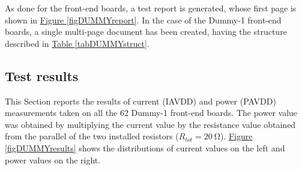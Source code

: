 \par
As done for the front-end boards, a test report is generated, whose first page is shown in \hyperref[figDUMMYreport]{Figure \ref{figDUMMYreport}}. In the case of the Dummy-1 front-end boards, a single multi-page document has been created, having the structure described in \hyperref[tabDUMMYstruct]{Table \ref{tabDUMMYstruct}}.

\begin{table}[h!]
    \centering
    \def\arraystretch{1.3}
    \caption{Structure of the entry for the Dummy-1 front-end boards test report.}
    \label{tabDUMMYstruct}
\end{table}


\subsection{Test results}
This Section reports the results of current (IAVDD) and power (PAVDD) measurements taken on all the 62 Dummy-1 front-end boards. The power value was obtained by multiplying the current value by the resistance value obtained from the parallel of the two installed resistors ($R_{tot} = \SI{20}{\ohm}$). \hyperref[figDUMMYresults]{Figure \ref{figDUMMYresults}} shows the distributions of current values on the left and power values on the right.

